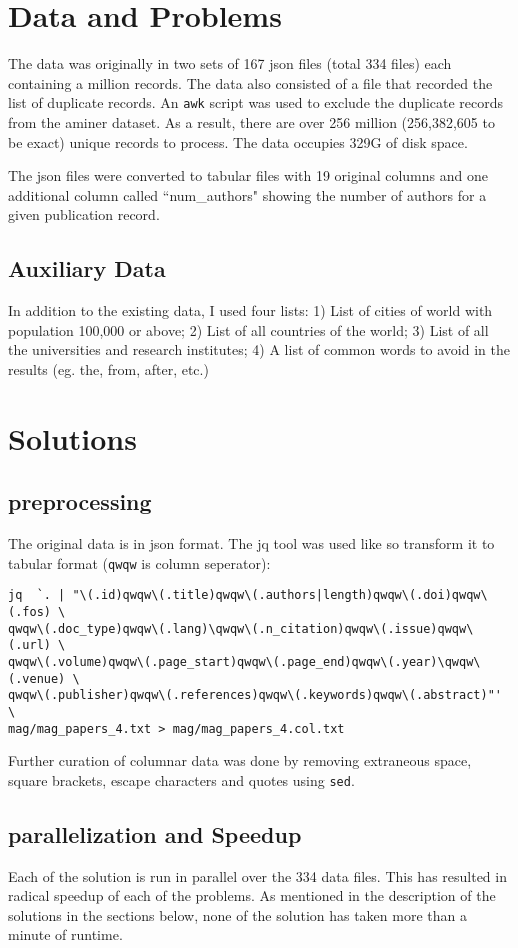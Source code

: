 \documentclass{report}
\begin{document}
\section*{Data and Problems}
The data was originally in two sets of 167 json files (total 334 files) each
containing a million records. The data also consisted of a file that recorded
the list of duplicate records. An \texttt{awk} script was used to exclude the
duplicate records from the aminer dataset. As a result, there are over 256
million (256,382,605 to be exact) unique records to process. The data occupies
329G of disk space.

The json files were converted to tabular files with 19 original columns and one
additional column called ``num\_authors" showing the number of authors for a given
publication record.

\subsection*{Auxiliary Data}
In addition to the existing data, I used four lists: 1) List of cities of
world with population 100,000 or above; 2) List of all countries of the world;
3) List of all the universities and research institutes; 4) A list of common
words to avoid in the results (eg. the, from, after, etc.)

\section*{Solutions}
\subsection*{preprocessing}
The original data is in json format. The jq tool was used like so transform it to tabular format (\texttt{qwqw} is column seperator):
\begin{verbatim}
jq  `. | "\(.id)qwqw\(.title)qwqw\(.authors|length)qwqw\(.doi)qwqw\(.fos) \
qwqw\(.doc_type)qwqw\(.lang)\qwqw\(.n_citation)qwqw\(.issue)qwqw\(.url) \
qwqw\(.volume)qwqw\(.page_start)qwqw\(.page_end)qwqw\(.year)\qwqw\(.venue) \
qwqw\(.publisher)qwqw\(.references)qwqw\(.keywords)qwqw\(.abstract)"' \
mag/mag_papers_4.txt > mag/mag_papers_4.col.txt
\end{verbatim}
Further curation of columnar data was done by removing extraneous space, square brackets, escape characters and quotes using \texttt{sed}.

\subsection*{parallelization and Speedup}
Each of the solution is run in parallel over the 334 data files. This has
resulted in radical speedup of each of the problems. As mentioned in the
description of the solutions in the sections below, none of the solution has
taken more than a minute of runtime.
\end{document}
